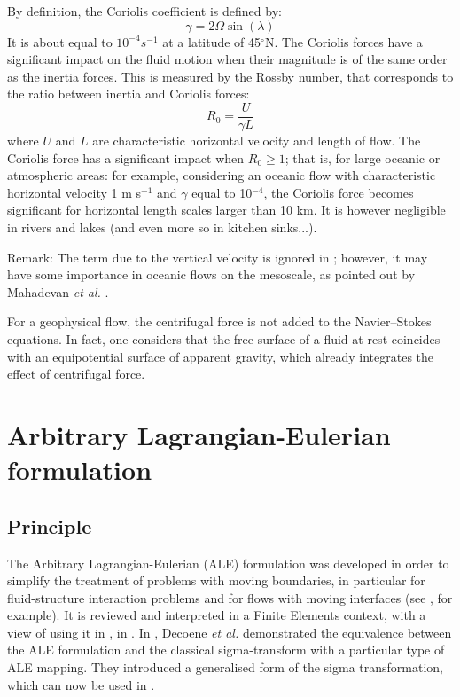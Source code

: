 By definition, the Coriolis coefficient%
is defined by:
\begin{equation}
\gamma=2\Omega\sin(\lambda)
\end{equation}
It is about equal to $10^{-4}s^{-1}$ at
a latitude of 45$^\circ$N. The Coriolis forces have a significant impact on the
fluid motion when their magnitude is of the same order as the inertia forces.
This is measured by the Rossby number, that corresponds to the ratio between
inertia and Coriolis forces:
\begin{equation}
R_{0}=\dfrac{U}{\gamma L}%
\end{equation}
where $U$ and $L$ are characteristic horizontal velocity and length of flow. The
Coriolis force has a significant impact when $R_{0}\ge 1$; that is, for large oceanic or
atmospheric areas: for example, considering an oceanic flow with characteristic
horizontal velocity 1 m s$^{-1}$ and $\gamma$ equal to 10$^{-4}$, the Coriolis force
becomes significant for horizontal length scales larger than 10 km.
It is however negligible in rivers and lakes (and even more so in kitchen sinks...).

\begin{CommentBlock}{Remark:}
The term due to the vertical
velocity is ignored in ; however, it may have some importance
in oceanic flows on the mesoscale, as pointed out by Mahadevan \textit{et al.} \cite{mahadevan96}.
\end{CommentBlock}

For a geophysical flow, the centrifugal force is not added to the
Navier--Stokes equations. In fact, one considers that the free surface of a
fluid at rest coincides with an equipotential surface of apparent gravity,
which already integrates the effect of centrifugal force.

\section{Arbitrary Lagrangian-Eulerian formulation}\label{sec:ALE}

\subsection{Principle}
The Arbitrary Lagrangian-Eulerian (ALE) formulation was developed in order to
simplify the treatment of problems with moving boundaries, in particular
for fluid-structure interaction problems and for flows with moving interfaces
(see \cite{Hirt1974, Chan1975, Donea1981}, for example). It is reviewed and interpreted
in a Finite Elements context, with a view of using it in , in \cite{Decoene2006}.
In \cite{Decoene2009}, Decoene \textit{et al.} demonstrated the equivalence between the
ALE formulation and the classical sigma-transform with a particular type of ALE mapping.
They introduced a generalised form of the sigma transformation, which can now be used in
.

